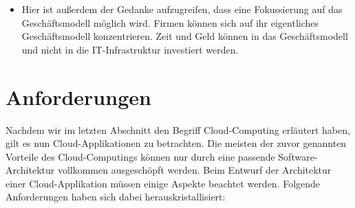 \begin{itemize}
  \item Hier ist außerdem der Gedanke aufzugreifen, dass eine Fokussierung auf das Geschäftsmodell möglich wird. Firmen können sich auf ihr eigentliches Geschäftsmodell konzentrieren. Zeit und Geld können in das Geschäftsmodell und nicht in die IT-Infrastruktur investiert werden.
\end{itemize}

\section{Anforderungen}
Nachdem wir im letzten Abschnitt den Begriff Cloud-Computing erläutert haben, gilt es nun Cloud-Applikationen zu betrachten. Die meisten der zuvor genannten Vorteile des Cloud-Computings können nur durch eine passende Software-Architektur vollkommen ausgeschöpft werden. Beim Entwurf der Architektur einer Cloud-Applikation müssen einige Aspekte beachtet werden. Folgende Anforderungen haben sich dabei herauskristallisiert:
